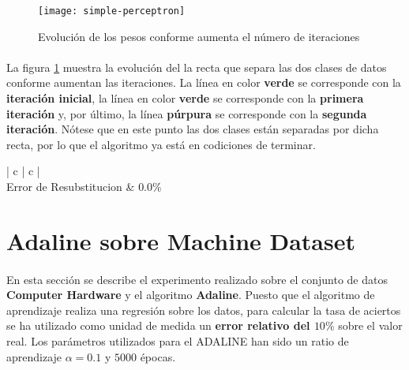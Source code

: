 \documentclass{article}
\begin{document}
		\begin{figure}[h]
			\begin{center}
				\texttt{[image: simple-perceptron]}
			\end{center}
			\caption{Evolución de los pesos conforme aumenta el número de iteraciones}
			\label{fig:e1_plot}
		\end{figure}

		\paragraph{}
		La figura \ref{fig:e1_plot} muestra la evolución del la recta que separa las dos clases de datos conforme aumentan las iteraciones. La línea en color \textbf{verde} se corresponde con la \textbf{iteración inicial}, la línea en color \textbf{verde} se corresponde con la \textbf{primera iteración} y, por último, la línea \textbf{púrpura} se corresponde con la \textbf{segunda iteración}. Nótese que en este punto las dos clases están separadas por dicha recta, por lo que el algoritmo ya está en codiciones de terminar.

		\begin{table}[h]
			\centering
			\small
			\begin{tabu}{ | c | c | }
				\hline
				 \\ \hline
				Error de Resubstitucion & $0.0\%$	 \\
				\hline
			\end{tabu}
			\caption{Resultados del experimento sobre el conjunto de datos Simple}
			\label{table:e1_error}
		\end{table}

	\section{Adaline sobre Machine Dataset}
	\label{sec:e2}

		\paragraph{}
		En esta sección se describe el experimento realizado sobre el conjunto de datos \textbf{Computer Hardware}\cite{dataset:computer_hardware} y el algoritmo \textbf{Adaline}. Puesto que el algoritmo de aprendizaje realiza una regresión sobre los datos, para calcular la tasa de aciertos se ha utilizado como unidad de medida un \textbf{error relativo del $10\%$} sobre el valor real. Los parámetros utilizados para el ADALINE han sido un ratio de aprendizaje $\alpha = 0.1$ y $5000$ épocas.
\end{document}
